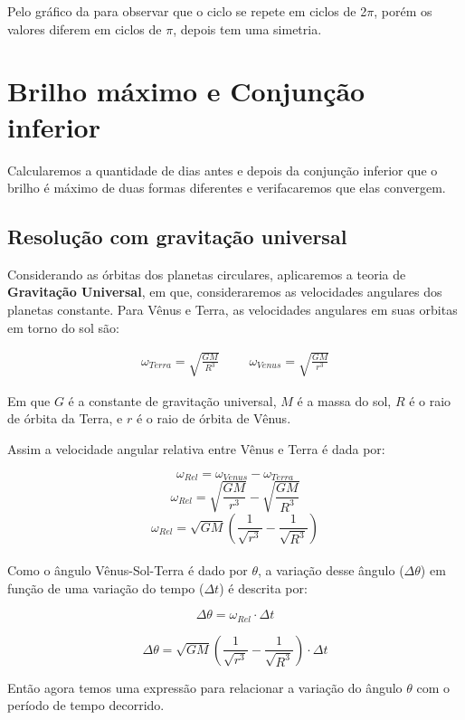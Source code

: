 \documentclass[a4paper, 12pt]{article}
\begin{document}
Pelo gráfico da para observar que o ciclo se repete em ciclos de 2$\pi$, porém os valores diferem em ciclos de $\pi$, depois tem uma simetria.

\section{Brilho máximo e Conjunção inferior}

Calcularemos a quantidade de dias antes e depois da conjunção inferior que o brilho é máximo de duas formas diferentes e verifacaremos que elas convergem.

\subsection{Resolução com gravitação universal}

Considerando as órbitas dos planetas circulares, aplicaremos a teoria de \textbf{Gravitação Universal}, em que, consideraremos as velocidades angulares dos planetas constante. Para Vênus e Terra, as velocidades angulares em suas orbitas em torno do sol são: 

$$\begin{matrix}
\boxed{\ \omega _{Terra}=\sqrt{\frac{GM}{R^3}}\ }\ \ \ &\ \ \boxed{\ \omega _{Venus}=\sqrt{\frac{GM}{r^3}}\ }
\end{matrix}$$

Em que $G$ é a constante de gravitação universal, $M$ é a massa do sol, $R$ é o raio de órbita da Terra, e $r$ é o raio de órbita de Vênus.

Assim a velocidade angular relativa entre Vênus e Terra é dada por:

$$\omega _{Rel}=\omega _{Venus}-\omega _{Terra}$$
$$\omega _{Rel}=\sqrt{\frac{GM}{r^3}}-\sqrt{\frac{GM}{R^3}}$$
$$\boxed{\ \omega _{Rel}=\sqrt{GM}\left(\frac{1}{\sqrt{r^3}}-\frac{1}{\sqrt{R^3}}\right)\ }$$\\

Como o ângulo Vênus-Sol-Terra é dado por $\theta$, a variação desse ângulo ($\Delta \theta $) em função de uma variação do tempo ($\Delta t$) é descrita por:

$$\Delta \theta =\omega _{Rel}\cdot \Delta t$$

\begin{equation}\label{teta_horaria}
    \boxed{\ \Delta \theta =\sqrt{GM}\left(\frac{1}{\sqrt{r^3}}-\frac{1}{\sqrt{R^3}}\right)\cdot \Delta t\ }
\end{equation}

Então agora temos uma expressão para relacionar a variação do ângulo $\theta$ com o período de tempo decorrido.
\end{document}
